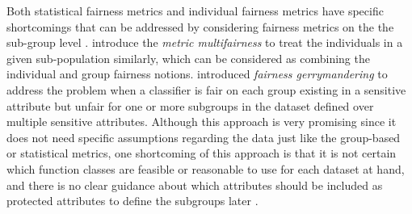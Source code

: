 
Both statistical fairness metrics and individual fairness metrics have specific shortcomings that can be addressed by considering fairness metrics on the the sub-group level \cite{mehrabi2019survey}.
\citeauthor{kim2018fairness} \cite{kim2018fairness} introduce the \emph{metric multifairness} to treat the individuals in a given sub-population similarly, which can be considered as combining the individual and group fairness notions. 
\citeauthor{kearns2018preventing} \cite{kearns2018preventing} introduced \emph{fairness gerrymandering} to address the problem  when a classifier is fair on each group existing in a sensitive attribute but unfair for one or more subgroups in the dataset defined over multiple sensitive attributes. Although this approach is very promising since it does not need specific assumptions regarding the data just like the group-based or statistical metrics, one shortcoming of this approach is that it is not certain which function classes are feasible or reasonable to use for each dataset at hand, and there is no clear guidance about which attributes should be included as protected attributes to define the subgroups later \cite{chouldechova2018frontiers}.



